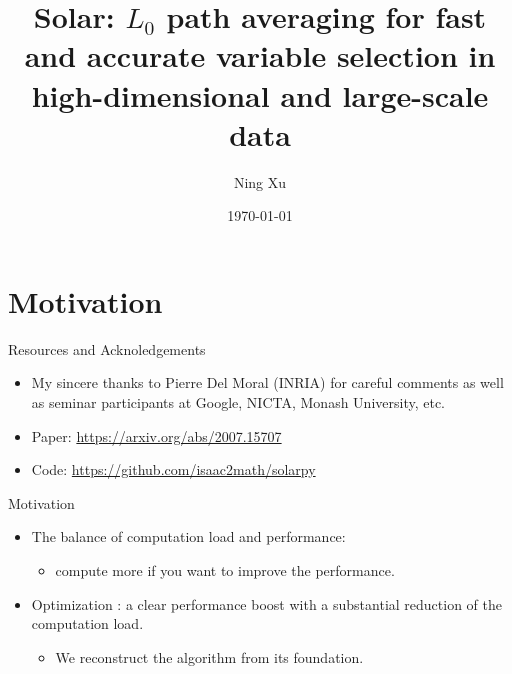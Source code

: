 \documentclass{beamer}
\title[Solar]{Solar: $L_0$ path averaging for fast and accurate variable selection in high-dimensional and large-scale data}
\author{Ning Xu}
\date{\today}
\begin{document}
\begin{frame}
  \titlepage
\end{frame}



\section{Motivation}

\begin{frame}{Resources and Acknoledgements}
  \begin{itemize}
    \item My sincere thanks to Pierre Del Moral (INRIA) for careful comments as well as seminar participants at Google, NICTA, Monash University, etc.
    \item Paper: \url{https://arxiv.org/abs/2007.15707}
    \item Code: \url{https://github.com/isaac2math/solarpy}
    \end{itemize}
\end{frame}

\begin{frame}{Motivation}

  \begin{itemize}
    \item The balance of computation load and performance:
    \begin{itemize}
      \item compute more if you want to improve the performance.
    \end{itemize}
    
    \item Optimization : a clear performance boost with a substantial reduction of the computation load.
    
    \begin{itemize}
      \item We reconstruct the algorithm from its foundation.
    \end{itemize}  
  \end{itemize}

\end{frame}
\end{document}
